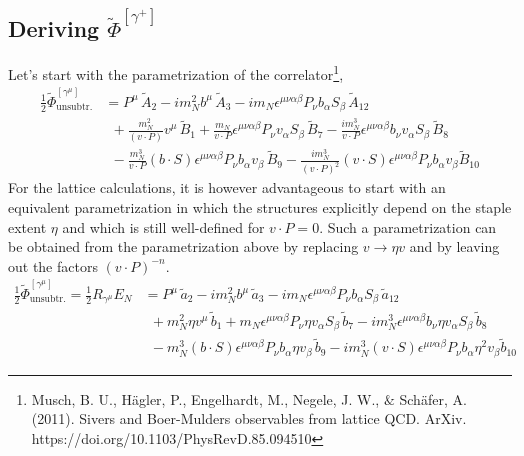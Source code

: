 \documentclass[]{article}
\numberwithin{equation}{section}
\newcommand{\tcdot}{{\cdot}}
\newcommand{\tAmp}{\widetilde{A}}
\newcommand{\tBmp}{\widetilde{B}}
\newcommand{\tAmp}{\ensuremath{\widetilde{A}^{(+)}}}
\newcommand{\tBmp}{\ensuremath{\widetilde{B}^{(+)}}}
\newcommand{\bvec}{b}
\newcommand{\mN}{m_N}
\newcommand{\unsub}{\text{unsubtr.}}
\begin{document}
\subsection{Deriving $\widetilde \Phi^{[\gamma^+]}$}
Let's start with the parametrization of the correlator\footnote{Musch, B. U., Hägler, P., Engelhardt, M., Negele, J. W., $\&$ Schäfer, A. (2011). Sivers and Boer-Mulders observables from lattice QCD. ArXiv. https://doi.org/10.1103/PhysRevD.85.094510},
\begin{align}
    \frac{1}{2}\widetilde \Phi^{[\gamma^\mu]}_{\unsub} & = 
		P^\mu\, \tAmp_2 - i \mN^2 \bvec^\mu\, \tAmp_3
		- i \mN \epsilon^{\mu \nu \alpha \beta} P_\nu \bvec_\alpha S_\beta\, \tAmp_{12} \nonumber \\ &
		~~+ \frac{\mN^2}{(v \tcdot P)} v^\mu\, \tBmp_1 
		+ \frac{\mN}{v \tcdot P} \epsilon^{\mu \nu \alpha \beta} P_\nu v_\alpha S_\beta\, \tBmp_7  
		- \frac{ i \mN^3}{v \tcdot P} \epsilon^{\mu \nu \alpha \beta} \bvec_\nu v_\alpha S_\beta\, \tBmp_8 \nonumber \\ &
		~~- \frac{\mN^3}{v \tcdot P} (\bvec \tcdot S) \epsilon^{\mu \nu \alpha \beta} P_\nu \bvec_\alpha v_\beta\, \tBmp_9
		- \frac{i \mN^3}{(v \tcdot P)^2} (v \tcdot S) \epsilon^{\mu \nu \alpha \beta} P_\nu \bvec_\alpha v_\beta \tBmp_{10}
\end{align}
 For the lattice calculations, it is however advantageous to start with an equivalent parametrization in which the structures explicitly depend on the staple extent $\eta$ and which is still well-defined for $v \tcdot P = 0$. Such a parametrization can be obtained from the parametrization above by replacing $v \rightarrow \eta v$ and by leaving out the factors $(v \tcdot P)^{-n}$. 
 \begin{align}
    \frac{1}{2}\widetilde \Phi^{[\gamma^\mu]}_{\unsub}=\frac{1}{2} R_{\gamma^{\mu}} E_N & =  
		P^\mu\, \tilde a_2 - i \mN^2 \bvec^\mu\, \tilde a_3
		- i \mN \epsilon^{\mu \nu \alpha \beta} P_\nu \bvec_\alpha S_\beta\, \tilde a_{12} \nonumber \\ &
		~~+ \mN^2 \eta v^\mu\, \tilde b_1 
		+ \mN \epsilon^{\mu \nu \alpha \beta} P_\nu \eta v_\alpha S_\beta\, \tilde b_7  
		-  i \mN^3 \epsilon^{\mu \nu \alpha \beta} \bvec_\nu \eta v_\alpha S_\beta\, \tilde b_8 \nonumber \\ &
		~~- \mN^3 (\bvec \tcdot S) \epsilon^{\mu \nu \alpha \beta} P_\nu \bvec_\alpha \eta v_\beta\, \tilde b_9
		-i \mN^3 (v \tcdot S) \epsilon^{\mu \nu \alpha \beta} P_\nu \bvec_\alpha \eta^2 v_\beta \tilde b_{10}
\end{align}
\end{document}
